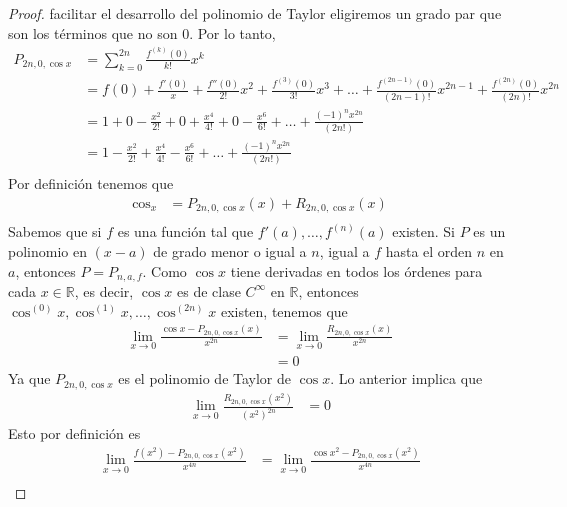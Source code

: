 \documentclass[a4paper]{article}
\begin{document}
\begin{proof}
    facilitar el desarrollo del polinomio de Taylor eligiremos un grado par que son 
    los términos que no son \(0\). Por lo tanto,
    \begin{align*}
        P_{2n, 0, \cos{x}} &= \sum_{k=0}^{2n} \frac{f^{(k)}(0)}{k!}x^{k} \\
        &= f(0) + \frac{f'(0)}x + \frac{f''(0)}{2!}x^{2} + \frac{f^{(3)}(0)}{3!}x^{3} + \dotsc + \frac{f^{(2n - 1)}(0)}{(2n - 1)!}x^{2n - 1} +\frac{f^{(2n)}(0)}{(2n)!}x^{2n} \\
        &= 1 + 0 - \frac{x^2}{2!} + 0 + \frac{x^4}{4!} + 0 - \frac{x^6}{6!} + \dotsc + \frac{(-1)^{n}x^{2n}}{(2n!)} \\
        &= 1 - \frac{x^2}{2!} + \frac{x^4}{4!} - \frac{x^6}{6!} + \dotsc + \frac{(-1)^{n}x^{2n}}{(2n!)} \\
    \end{align*}
    Por definición tenemos que 
    \begin{align*}
        \cos_{x} &= P_{2n, 0, \cos{x}}(x) + R_{2n, 0, \cos{x}}(x) \\
    \end{align*}
    Sabemos que si \(f\) es una función tal que \(f'(a), \dotsc, f^{(n)}(a)\) existen. Si 
    \(P\) es un polinomio en \((x-a)\) de grado menor o igual a \(n\), igual a \(f\) 
    hasta el orden \(n\) en \(a\), entonces \(P = P_{n, a, f}\).
    Como \(\cos{x}\) tiene derivadas en todos los órdenes para cada 
    \(x \in \mathbb{R}\), es decir, \(\cos{x}\) es de clase \(C^{\infty}\) en \(\mathbb{R}\), 
    entonces \(\cos^{(0)}{x}, \cos^{(1)}{x}, \dotsc, \cos^{(2n)}{x}\) existen, tenemos que 
    \begin{align*}
        \lim_{x \to 0} \frac{\cos{x} - P_{2n, 0, \cos{x}}(x)}{x^{2n}} &= \lim_{x \to 0} \frac{R_{2n, 0, \cos{x}}(x)}{x^{2n}}\\
        &= 0
    \end{align*}
    Ya que \(P_{2n, 0, \cos{x}}\) es el polinomio de Taylor de \(\cos{x}\).
    \newline
    Lo anterior implica que
    \begin{align*}
        \lim_{x \to 0} \frac{R_{2n, 0, \cos{x}}(x^2)}{(x^2)^{2n}} &= 0
    \end{align*}
    Esto por definición es
    \begin{align*}
        \lim_{x \to 0} \frac{f(x^2) - P_{2n, 0, \cos{x}}(x^2)}{x^{4n}} &= 
        \lim_{x \to 0} \frac{\cos{x^2} - P_{2n, 0, \cos{x}}(x^2)}{x^{4n}} \\
    \end{align*}

\end{proof}
\end{document}
